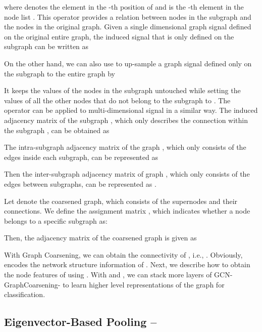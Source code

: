 \documentclass[sigconf]{acmart}
\begin{document}
where  denotes the element in the -th position of  and  is the -th element in the node list . This operator provides a relation between nodes in the subgraph  and the nodes in the original graph. Given a single dimensional graph signal  defined on the original entire graph, the induced signal that is only defined on the subgraph  can be written as  

On the other hand, we can also use  to up-sample a graph signal  defined only on the subgraph  to the entire graph  by 

It keeps the values of the nodes in the subgraph untouched while setting the values of all the other nodes that do not belong to the subgraph to . The operator can be applied to multi-dimensional signal  in a similar way. The induced adjacency matrix  of the subgraph , which only describes the connection within the subgraph , can be obtained as

The intra-subgraph adjacency matrix of the graph , which only consists of the edges inside each subgraph, can be represented as

Then the inter-subgraph adjacency matrix of graph , which only consists of the edges between subgraphs, can be represented as . 

Let   denote the coarsened graph, which consists of the supernodes and their connections. We define the assignment matrix , which indicates whether a node belongs to a specific subgraph as:

Then, the adjacency matrix of the coarsened graph is given as 


With Graph Coarsening, we can obtain the connectivity of , i.e., . Obviously,  encodes the network structure information of . Next, we describe how to obtain the node features  of  using . With  and , we can stack more layers of GCN-GraphCoarsening- to learn higher level representations of the graph for classification.

\subsection{Eigenvector-Based Pooling -- }
\end{document}
